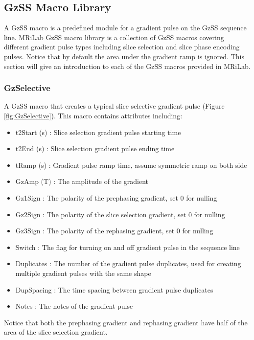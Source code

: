 \documentclass{book}%
\begin{document}
\subsection{GzSS Macro Library}

A GzSS macro is a predefined module for a gradient pulse on the GzSS sequence line. MRiLab GzSS macro library is a collection of GzSS macros covering different gradient pulse types including slice selection and slice phase encoding pulses. Notice that by default the area under the gradient ramp is ignored. This section will give an introduction to each of the GzSS macros provided in MRiLab.

\subsubsection{GzSelective}

A GzSS macro that creates a typical slice selective gradient pulse (Figure \ref{fig:GzSelective}). This macro contains attributes including:

\begin{itemize}
	\item t2Start (s) : Slice selection gradient pulse starting time
	\item t2End (s) : Slice selection gradient pulse ending time
	\item tRamp (s) : Gradient pulse ramp time, assume symmetric ramp on both side
	\item GzAmp (T) : The amplitude of the gradient
	\item Gz1Sign : The polarity of the prephasing gradient, set 0 for nulling
	\item Gz2Sign : The polarity of the slice selection gradient, set 0 for nulling
	\item Gz3Sign : The polarity of the rephasing gradient, set 0 for nulling
	\item Switch : The flag for turning on and off gradient pulse in the sequence line
	\item Duplicates : The number of the gradient pulse duplicates, used for creating multiple gradient pulses with the same shape
	\item DupSpacing : The time spacing between gradient pulse duplicates
	\item Notes : The notes of the gradient pulse 
\end{itemize}

Notice that both the prephasing gradient and rephasing gradient have half of the area of the slice selection gradient.
\end{document}
